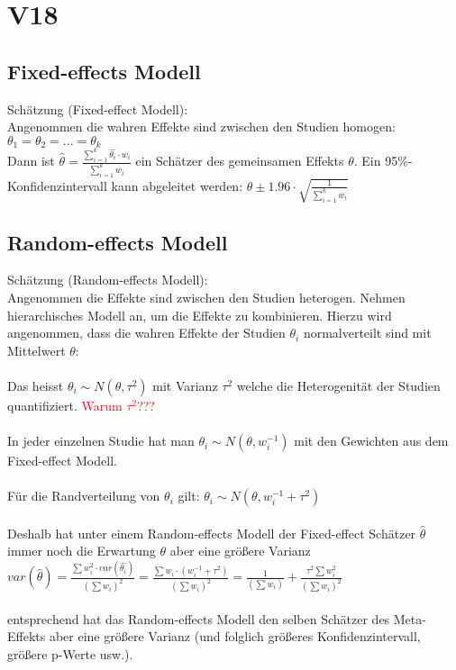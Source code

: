 \section{V18}
\subsection{Fixed-effects Modell}
Schätzung (Fixed-effect Modell):\\
Angenommen die wahren Effekte sind zwischen den Studien homogen:\\
$\theta_1=\theta_2=...=\theta_k$\\
Dann ist $\hat{\theta}=\frac{\displaystyle \sum_{i=1}^{k} \hat{\theta_i} \cdot w_i}{\displaystyle \sum_{i=1}^{k}w_i}$ ein Schätzer des gemeinsamen Effekts $\theta$.
Ein 95\%-Konfidenzintervall kann abgeleitet werden: $\hat{\theta} \pm 1.96\cdot \sqrt{\frac{1}{\displaystyle \sum_{i=1}^{k}w_i}}$

\subsection{Random-effects Modell}
Schätzung (Random-effects Modell):\\
Angenommen die Effekte sind zwischen den Studien heterogen. Nehmen hierarchisches Modell an, um die Effekte zu kombinieren. Hierzu wird angenommen, dass die wahren Effekte der Studien $\theta_i$ normalverteilt sind mit Mittelwert $\theta$:\\
\\
Das heisst $\theta_i \sim N(\theta, \tau^2)$ mit Varianz $\tau^2$ welche die Heterogenität der Studien quantifiziert. \textcolor{red}{Warum $\tau^2$???}\\
\\
In jeder einzelnen Studie hat man $\theta_i \sim N(\theta, w^{-1}_i)$ mit den Gewichten aus dem Fixed-effect Modell.\\
\\
Für die Randverteilung von $\theta_i$ gilt: $\theta_i \sim N(\theta, w^{-1}_i + \tau^2)$\\
\\
Deshalb hat unter einem Random-effects Modell der Fixed-effect
Schätzer $\hat{\theta}$ immer noch die Erwartung $\theta$ aber eine größere Varianz\\
$var(\hat{\theta})=\frac{\displaystyle \sum w_i^2 \cdot var(\hat{\theta_i})}{(\displaystyle \sum w_i)^2}=\frac{\displaystyle \sum w_i \cdot (w_i^{-1} + \tau^2)}{(\displaystyle \sum w_i)^2}= \frac{\displaystyle 1}{(\displaystyle \sum w_i)} + \frac{\displaystyle \tau^2 \sum w_i^2}{(\displaystyle \sum w_i)^2}$\\\\
entsprechend hat das Random-effects Modell den selben Schätzer des Meta-Effekts aber eine größere Varianz (und folglich größeres Konfidenzintervall, größere p-Werte usw.).

